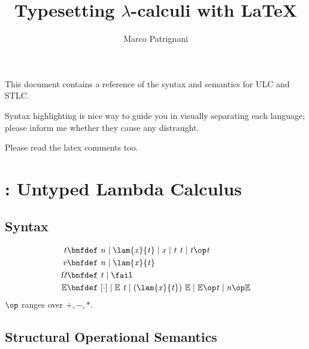 \documentclass{article}
\title{
	Typesetting $\lambda$-calculi with \LaTeX
}
\author{
	Marco Patrignani
}
\date{}
\begin{document}
\maketitle

This document contains a reference of the syntax and semantics for ULC and STLC.

Syntax highlighting is nice way to guide you in visually separating each language; please inform me whether they cause any distraught.

\begin{center}
	\Large
	Please read the latex comments too.
\end{center}
\tableofcontents

\newpage

\section{\ulc: Untyped Lambda Calculus}

\subsection{Syntax}

\begin{align*}
	\com{t} \bnfdef&\
		\com{n} \mid \com{\lam{x}{t}} \mid \com{x} \mid \com{t\ t} \mid \com{t \op t} %
	\\
	\com{v} \bnfdef&\
		\com{n} \mid \com{\lam{x}{t}}
	\\
	\com{\Omega} \bnfdef&\
		\com{t} \mid \com{\fail}
	\\
	\com{\evalctx} \bnfdef&\
		\com{\hole{\cdot}} \mid \com{\evalctx\ t} \mid \com{(\lam{x}{t})\ \evalctx} \mid \com{\evalctx \op t} \mid \com{n \op \evalctx}
\end{align*}
$\op$ ranges over $+, -, *$.

\subsection{Structural Operational Semantics}
\end{document}
